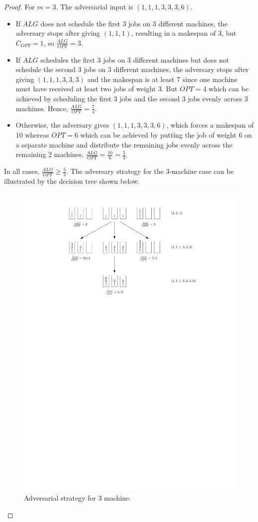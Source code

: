 \documentclass[11pt]{article}
\begin{document}
\begin{enumerate}[leftmargin=16pt]
\begin{enumerate}[leftmargin=16pt]
\begin{proof}
            For $m = 3$. The adversarial input is $(1,1,1,3,3,3,6)$.
            \begin{itemize}
                \item If $ALG$ does not schedule the first 3 jobs on 3 different machines, the adversary stops after giving $(1,1,1)$, resulting in a makespan of 3, but $C_{OPT} = 1$, so $\frac{ALG}{OPT} = 3$.
                \item If $ALG$ schedules the first 3 jobs on 3 different machines but does not schedule the second 3 jobs on 3 different machines, the adversary stops after giving $(1,1,1,3,3,3)$ and the makespan is at least 7 since one machine must have received at least two jobs of weight 3. But $OPT = 4$ which can be achieved by scheduling the first 3 jobs and the second 3 jobs evenly across 3 machines. Hence, $\frac{ALG}{OPT} = \frac{7}{4}$.
                \item Otherwise, the adversary gives $(1,1,1,3,3,3,6)$, which forces a makespan of 10 whereas $OPT = 6$ which can be achieved by putting the job of weight 6 on a separate machine and distribute the remaining jobs evenly across the remaining 2 machines. $\frac{ALG}{OPT} = \frac{10}{6} = \frac{5}{3}$.
            \end{itemize}
            In all cases, $\frac{ALG}{OPT} \geq \frac{5}{3}$. The adversary strategy for the 3-machine case can be illustrated by the decision tree shown below.
            \begin{figure}[htbp]
                \centering
                \includegraphics[width=0.6\linewidth]{figures/makespan-adv.pdf}
                \caption{Adversarial strategy for 3 machine.}
                \label{fig:makespan-adv}
            \end{figure}
        \end{proof}


\end{enumerate}
\end{enumerate}
\end{document}
